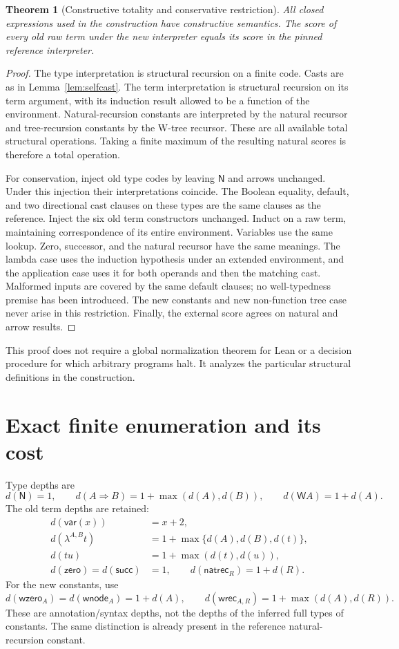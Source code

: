 \documentclass[11pt]{article}
\newtheorem{theorem}{Theorem}[section]
\theoremstyle{definition}
\newcommand{\W}{\mathsf W}
\begin{document}
\begin{theorem}[Constructive totality and conservative restriction]
\label{thm:totality}
All closed expressions used in the construction have constructive semantics.
The score of every old raw term under the new interpreter equals its score in
the pinned reference interpreter.
\end{theorem}
\begin{proof}
The type interpretation is structural recursion on a finite code. Casts are
as in Lemma~\ref{lem:selfcast}. The term interpretation is structural recursion
on its term argument, with its induction result allowed to be a function of
the environment. Natural-recursion constants are interpreted by the natural
recursor and tree-recursion constants by the W-tree recursor. These are all
available total structural operations. Taking a finite maximum of the resulting
natural scores is therefore a total operation.

For conservation, inject old type codes by leaving $\mathsf N$ and arrows
unchanged. Under this injection their interpretations coincide. The Boolean
equality, default, and two directional cast clauses on these types are the
same clauses as the reference. Inject the six old term constructors unchanged.
Induct on a raw term, maintaining correspondence of its entire environment.
Variables use the same lookup. Zero, successor, and the natural recursor have
the same meanings. The lambda case uses the induction hypothesis under an
extended environment, and the application case uses it for both operands and
then the matching cast. Malformed inputs are covered by the same default
clauses; no well-typedness premise has been introduced. The new constants and
new non-function tree case never arise in this restriction. Finally, the external
score agrees on natural and arrow results.
\end{proof}
This proof does not require a global normalization theorem for Lean or a
decision procedure for which arbitrary programs halt. It analyzes the particular
structural definitions in the construction.

\section{Exact finite enumeration and its cost}
\label{sec:enumeration}
Type depths are
\[
 d(\mathsf N)=1,\qquad d(A\Rightarrow B)=1+\max(d(A),d(B)),
 \qquad d(\W A)=1+d(A).
\]
The old term depths are retained:
\begin{align*}
 d(\mathsf{var}(x))&=x+2,\\
 d(\lambda^{A,B}t)&=1+\max\{d(A),d(B),d(t)\},\\
 d(tu)&=1+\max(d(t),d(u)),\\
 d(\mathsf{zero})=d(\mathsf{succ})&=1,\qquad
 d(\mathsf{natrec}_R)=1+d(R).
\end{align*}
For the new constants, use
\[
 d(\mathsf{wzero}_A)=d(\mathsf{wnode}_A)=1+d(A),\qquad
 d(\mathsf{wrec}_{A,R})=1+\max(d(A),d(R)).
\]
These are annotation/syntax depths, not the depths of the inferred full types
of constants. The same distinction is already present in the reference
natural-recursion constant.
\end{document}
